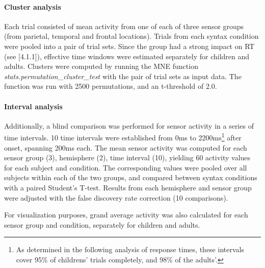 \paragraph{Cluster analysis}
Each trial consisted of mean activity from one of each of three sensor groups (from parietal, temporal and frontal locations).
Trials from each syntax condition were pooled into a pair of trial sets.
Since the group had a strong impact on RT (see [4.1.1]), effective time windows were estimated separately for children and adults.
Clusters were computed by running the MNE function \emph{stats.permutation\_cluster\_test} \cite{3.3.clustertest} with the pair of trial sets as input data.
The function was run with 2500 permutations, and an t-threshold of 2.0.

\paragraph{Interval analysis}
Additionally, a blind comparison was performed for sensor activity in a series of time intervals.
10 time intervals were established from 0ms to 2200ms\footnote{As determined in the following analysis of response times, these intervals cover 95\% of childrens' trials completely, and 98\% of the adults'.} after onset, spanning 200ms each.
The mean sensor activity was computed for each sensor group (3), hemisphere (2), time interval (10), yielding 60 activity values for each subject and condition.
The corresponding values were pooled over all subjects within each of the two groups, and compared between syntax conditions with a paired Student's T-test.
Results from each hemisphere and sensor group were adjusted with the false discovery rate correction (10 comparisons).

For visualization purposes, grand average activity was also calculated for each sensor group and condition, separately for children and adults.

